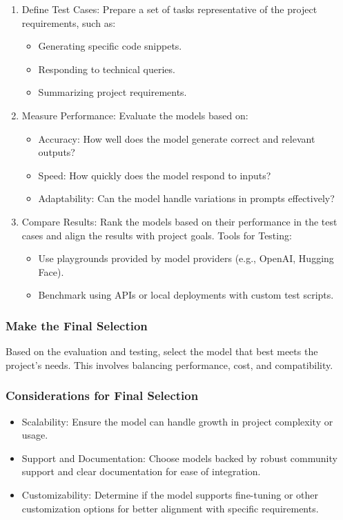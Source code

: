 \documentclass[14pt, a4paper]{article}
\begin{document}
\begin{enumerate}
    \item Define Test Cases: Prepare a set of tasks representative of the
    project requirements, such as:
    \begin{itemize}
        \item Generating specific code snippets.
        \item Responding to technical queries.
        \item Summarizing project requirements.
    \end{itemize}
    \item Measure Performance: Evaluate the models based on:
    \begin{itemize}
        \item Accuracy: How well does the model generate correct and relevant
        outputs?
        \item Speed: How quickly does the model respond to inputs?
        \item Adaptability: Can the model handle variations in prompts
        effectively?
    \end{itemize}
    \item Compare Results: Rank the models based on their performance in the
    test cases and align the results with project goals. Tools for Testing:
    \begin{itemize}
        \item Use playgrounds provided by model providers (e.g., OpenAI, Hugging
        Face).
        \item Benchmark using APIs or local deployments with custom test
        scripts.
    \end{itemize}
\end{enumerate}

\subsubsection{Make the Final Selection}

Based on the evaluation and testing, select the model that best meets the
project’s needs. This involves balancing performance, cost, and compatibility.

\subsubsection*{Considerations for Final Selection}

\begin{itemize}
    \item Scalability: Ensure the model can handle growth in project complexity
    or usage.
    \item Support and Documentation: Choose models backed by robust community
    support and clear documentation for ease of integration.
    \item Customizability: Determine if the model supports fine-tuning or other
    customization options for better alignment with specific requirements.
\end{itemize}
\end{document}
